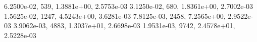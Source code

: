 6.2500e-02,   539, 1.3881e+00, 2.5753e-03 
3.1250e-02,   680, 1.8361e+00, 2.7002e-03 
1.5625e-02,  1247, 4.5243e+00, 3.6281e-03 
7.8125e-03,  2458, 7.2565e+00, 2.9522e-03 
3.9062e-03,  4883, 1.3037e+01, 2.6698e-03 
1.9531e-03,  9742, 2.4578e+01, 2.5228e-03 
